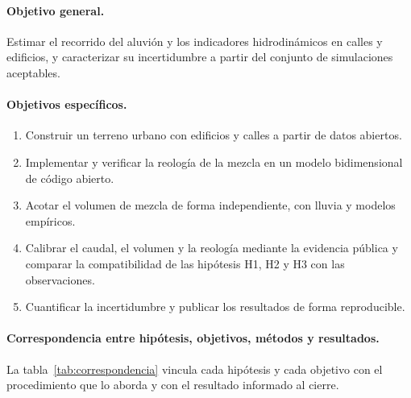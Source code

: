 \paragraph{Objetivo general.} Estimar el recorrido del aluvión y los indicadores hidrodinámicos en calles y edificios, y caracterizar su incertidumbre a partir del conjunto de simulaciones aceptables.

\paragraph{Objetivos específicos.}
\begin{enumerate}
\item Construir un terreno urbano con edificios y calles a partir de datos abiertos.
\item Implementar y verificar la reología de la mezcla en un modelo bidimensional de código abierto.
\item Acotar el volumen de mezcla de forma independiente, con lluvia y modelos empíricos.
\item Calibrar el caudal, el volumen y la reología mediante la evidencia pública y comparar la compatibilidad de las hipótesis H1, H2 y H3 con las observaciones.
\item Cuantificar la incertidumbre y publicar los resultados de forma reproducible.
\end{enumerate}

\paragraph{Correspondencia entre hipótesis, objetivos, métodos y resultados.} La tabla~\ref{tab:correspondencia} vincula cada hipótesis y cada objetivo con el procedimiento que lo aborda y con el resultado informado al cierre.

